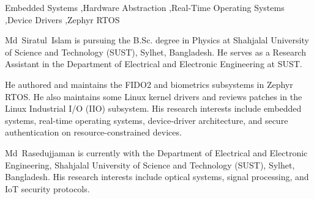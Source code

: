\documentclass[a4paper,fleqn]{cas-dc}
\begin{document}

\begin{keywords}
    Embedded Systems \sep Hardware Abstraction \sep Real-Time Operating Systems \sep Device Drivers \sep Zephyr RTOS
\end{keywords}

\maketitle









\printcredits

% 




\bio{}
Md~Siratul~Islam is pursuing the B.Sc. degree in Physics at Shahjalal University of Science and Technology (SUST), Sylhet, Bangladesh. He serves as a Research Assistant in the Department of Electrical and Electronic Engineering at SUST.

He authored and maintains the FIDO2 and biometrics subsystems in Zephyr RTOS. He also maintains some Linux kernel drivers and reviews patches in the Linux Industrial I/O (IIO) subsystem. His research interests include embedded systems, real-time operating systems, device-driver architecture, and secure authentication on resource-constrained devices.
\endbio

\bio{}
Md~Rasedujjaman is currently with the Department of Electrical and Electronic Engineering, Shahjalal University of Science and Technology (SUST), Sylhet, Bangladesh. His research interests include optical systems, signal processing, and IoT security protocols.
\endbio
\end{document}
